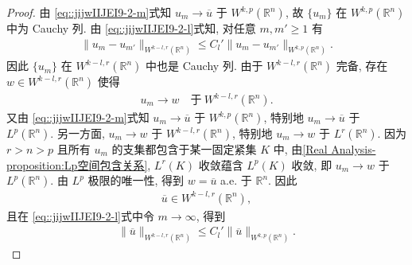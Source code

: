 \documentclass[../../main.tex]{subfiles}
\begin{document}
\begin{proof}
由 \eqref{eq::jijwIIJEI9-2-m}式知 $u_{m}\to\overline{u}$ 于 $W^{k,p}(\mathbb{R}^{n})$, 故 $\{u_{m}\}$ 在 $W^{k,p}(\mathbb{R}^{n})$ 中为 Cauchy 列. 由 \eqref{eq::jijwIIJEI9-2-l}式知, 对任意 $m,m'\geqslant1$ 有
\begin{align}\label{eq::jijwIIJEI9-2-cauchy}
\|u_{m}-u_{m'}\|_{W^{k-l,r}(\mathbb{R}^{n})}\leqslant C_{l}'\|u_{m}-u_{m'}\|_{W^{k,p}(\mathbb{R}^{n})}.
\end{align}
因此 $\{u_{m}\}$ 在 $W^{k-l,r}(\mathbb{R}^{n})$ 中也是 Cauchy 列. 由于 $W^{k-l,r}(\mathbb{R}^{n})$ 完备, 存在 $w\in W^{k-l,r}(\mathbb{R}^{n})$ 使得
\begin{align*}
u_{m}\to w\quad\text{于}\ W^{k-l,r}(\mathbb{R}^{n}).
\end{align*}
又由 \eqref{eq::jijwIIJEI9-2-m}式知 $u_{m}\to\overline{u}$ 于 $W^{k,p}(\mathbb{R}^{n})$, 特别地 $u_{m}\to\overline{u}$ 于 $L^{p}(\mathbb{R}^{n})$. 另一方面, $u_{m}\to w$ 于 $W^{k-l,r}(\mathbb{R}^{n})$, 特别地 $u_{m}\to w$ 于 $L^{r}(\mathbb{R}^{n})$. 因为 $r>n>p$ 且所有 $u_{m}$ 的支集都包含于某一固定紧集 $K$ 中, 由\cref{Real Analysis-proposition:Lp空间包含关系}, $L^{r}(K)$ 收敛蕴含 $L^{p}(K)$ 收敛, 即 $u_{m}\to w$ 于 $L^{p}(\mathbb{R}^{n})$. 由 $L^{p}$ 极限的唯一性, 得到 $w=\overline{u}$ a.e. 于 $\mathbb{R}^{n}$. 因此
\begin{align*}
\overline{u}\in W^{k-l,r}(\mathbb{R}^{n}),
\end{align*}
且在 \eqref{eq::jijwIIJEI9-2-l}式中令 $m\to\infty$, 得到
\begin{align}\label{eq::jijwIIJEI9-2-bar}
\|\overline{u}\|_{W^{k-l,r}(\mathbb{R}^{n})}\leqslant C_{l}'\|\overline{u}\|_{W^{k,p}(\mathbb{R}^{n})}.
\end{align}


\end{proof}
\end{document}
